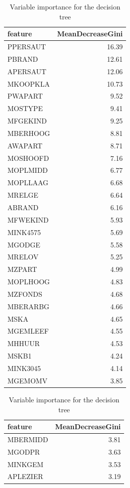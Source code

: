 \documentclass[
  12pt,
  oneside]{report}
\begin{document}
\begin{table}[H]
\caption{\label{tab:unnamed-chunk-21}Variable importance for the decision tree}

\centering
\fontsize{9}{11}\selectfont
\begin{tabular}[t]{l|r}
\hline
feature & MeanDecreaseGini\\
\hline
PPERSAUT & 16.39\\
\hline
PBRAND & 12.61\\
\hline
APERSAUT & 12.06\\
\hline
MKOOPKLA & 10.73\\
\hline
PWAPART & 9.52\\
\hline
MOSTYPE & 9.41\\
\hline
MFGEKIND & 9.25\\
\hline
MBERHOOG & 8.81\\
\hline
AWAPART & 8.71\\
\hline
MOSHOOFD & 7.16\\
\hline
MOPLMIDD & 6.77\\
\hline
MOPLLAAG & 6.68\\
\hline
MRELGE & 6.64\\
\hline
ABRAND & 6.16\\
\hline
MFWEKIND & 5.93\\
\hline
MINK4575 & 5.69\\
\hline
MGODGE & 5.58\\
\hline
MRELOV & 5.25\\
\hline
MZPART & 4.99\\
\hline
MOPLHOOG & 4.83\\
\hline
MZFONDS & 4.68\\
\hline
MBERARBG & 4.66\\
\hline
MSKA & 4.65\\
\hline
MGEMLEEF & 4.55\\
\hline
MHHUUR & 4.53\\
\hline
MSKB1 & 4.24\\
\hline
MINK3045 & 4.14\\
\hline
MGEMOMV & 3.85\\
\hline
\end{tabular}
\centering
\begin{tabular}[t]{l|r}
\hline
feature & MeanDecreaseGini\\
\hline
MBERMIDD & 3.81\\
\hline
MGODPR & 3.63\\
\hline
MINKGEM & 3.53\\
\hline
APLEZIER & 3.19\\

\end{tabular}
\end{table}
\end{document}
